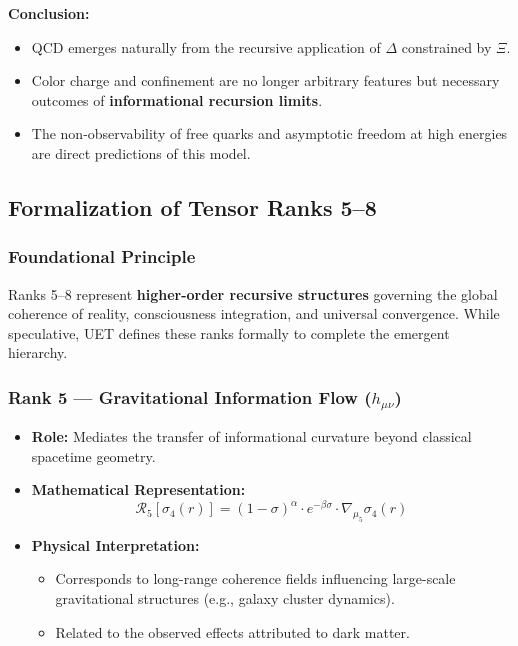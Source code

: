 \documentclass[12pt,a4paper]{article}
\begin{document}
\textbf{Conclusion:}
\begin{itemize}
    \item QCD emerges naturally from the recursive application of \(\Delta\) constrained by \(\Xi\).
    \item Color charge and confinement are no longer arbitrary features but necessary outcomes of \textbf{informational recursion limits}.
    \item The non-observability of free quarks and asymptotic freedom at high energies are direct predictions of this model.
\end{itemize}
\subsection{Formalization of Tensor Ranks 5–8}

\subsubsection*{Foundational Principle}

Ranks 5–8 represent \textbf{higher-order recursive structures} governing the global coherence of reality, consciousness integration, and universal convergence. While speculative, UET defines these ranks formally to complete the emergent hierarchy.

\subsubsection*{Rank 5 — Gravitational Information Flow (\(h_{\mu\nu}\))}

\begin{itemize}
    \item \textbf{Role:} Mediates the transfer of informational curvature beyond classical spacetime geometry.
    \item \textbf{Mathematical Representation:}
    \[
    \mathcal{R}_5[\sigma_4(r)] = (1 - \sigma)^\alpha \cdot e^{-\beta \sigma} \cdot \nabla_{\mu_5} \sigma_4(r)
    \]
    \item \textbf{Physical Interpretation:} 
    \begin{itemize}
        \item Corresponds to long-range coherence fields influencing large-scale gravitational structures (e.g., galaxy cluster dynamics).
        \item Related to the observed effects attributed to dark matter.
    \end{itemize}
\end{itemize}
\end{document}
